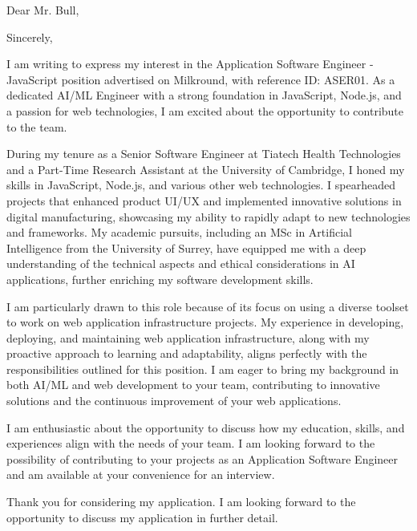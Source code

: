 \date{March 01, 2024}
\opening{Dear Mr. Bull,}
\closing{Sincerely,}
\makelettertitle

I am writing to express my interest in the Application Software Engineer - JavaScript position advertised on Milkround, with reference ID: ASER01. As a dedicated AI/ML Engineer with a strong foundation in JavaScript, Node.js, and a passion for web technologies, I am excited about the opportunity to contribute to the team.

During my tenure as a Senior Software Engineer at Tiatech Health Technologies and a Part-Time Research Assistant at the University of Cambridge, I honed my skills in JavaScript, Node.js, and various other web technologies. I spearheaded projects that enhanced product UI/UX and implemented innovative solutions in digital manufacturing, showcasing my ability to rapidly adapt to new technologies and frameworks. My academic pursuits, including an MSc in Artificial Intelligence from the University of Surrey, have equipped me with a deep understanding of the technical aspects and ethical considerations in AI applications, further enriching my software development skills.

I am particularly drawn to this role because of its focus on using a diverse toolset to work on web application infrastructure projects. My experience in developing, deploying, and maintaining web application infrastructure, along with my proactive approach to learning and adaptability, aligns perfectly with the responsibilities outlined for this position. I am eager to bring my background in both AI/ML and web development to your team, contributing to innovative solutions and the continuous improvement of your web applications.

I am enthusiastic about the opportunity to discuss how my education, skills, and experiences align with the needs of your team. I am looking forward to the possibility of contributing to your projects as an Application Software Engineer and am available at your convenience for an interview.

Thank you for considering my application. I am looking forward to the opportunity to discuss my application in further detail.

\makeletterclosing
